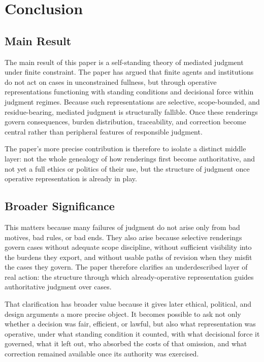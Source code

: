 \documentclass[11pt]{article}
\begin{document}
\section{Conclusion}

\subsection{Main Result}

The main result of this paper is a self-standing theory of mediated judgment under finite constraint. The paper has argued that finite agents and institutions do not act on cases in unconstrained fullness, but through operative representations functioning with standing conditions and decisional force within judgment regimes. Because such representations are selective, scope-bounded, and residue-bearing, mediated judgment is structurally fallible. Once these renderings govern consequences, burden distribution, traceability, and correction become central rather than peripheral features of responsible judgment.

The paper's more precise contribution is therefore to isolate a distinct middle layer: not the whole genealogy of how renderings first become authoritative, and not yet a full ethics or politics of their use, but the structure of judgment once operative representation is already in play.

\subsection{Broader Significance}

This matters because many failures of judgment do not arise only from bad motives, bad rules, or bad ends. They also arise because selective renderings govern cases without adequate scope discipline, without sufficient visibility into the burdens they export, and without usable paths of revision when they misfit the cases they govern. The paper therefore clarifies an underdescribed layer of real action: the structure through which already-operative representation guides authoritative judgment over cases.

That clarification has broader value because it gives later ethical, political, and design arguments a more precise object. It becomes possible to ask not only whether a decision was fair, efficient, or lawful, but also what representation was operative, under what standing condition it counted, with what decisional force it governed, what it left out, who absorbed the costs of that omission, and what correction remained available once its authority was exercised.
\end{document}
